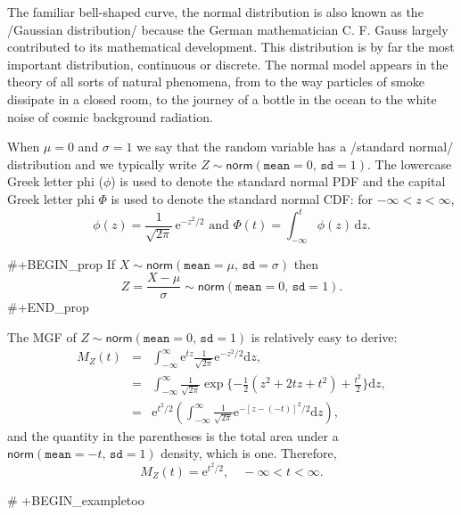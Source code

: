 The familiar bell-shaped curve, the normal distribution is also known
as the /Gaussian distribution/ because the German mathematician
C. F. Gauss largely contributed to its mathematical development. This
distribution is by far the most important distribution, continuous or
discrete. The normal model appears in the theory of all sorts of
natural phenomena, from to the way particles of smoke dissipate in a
closed room, to the journey of a bottle in the ocean to the white
noise of cosmic background radiation.

When \(\mu=0\) and \(\sigma=1\) we say that the random variable has a
/standard normal/ distribution and we typically write
\(Z\sim\mathsf{norm}(\mathtt{mean}=0,\,\mathtt{sd}=1)\). The lowercase
Greek letter phi (\(\phi\)) is used to denote the standard normal PDF
and the capital Greek letter phi \(\Phi\) is used to denote the
standard normal CDF: for \(-\infty<z<\infty\),
\begin{equation}
\phi(z)=\frac{1}{\sqrt{2\pi}}\,\mathrm{e}^{-z^{2}/2}\mbox{ and }\Phi(t)=\int_{-\infty}^{t}\phi(z)\,\mathrm{d} z.
\end{equation}

#+BEGIN_prop
If \(X\sim\mathsf{norm}(\mathtt{mean}=\mu,\,\mathtt{sd}=\sigma)\) then
\begin{equation}
Z=\frac{X-\mu}{\sigma}\sim\mathsf{norm}(\mathtt{mean}=0,\,\mathtt{sd}=1).
\end{equation}
#+END_prop

The MGF of \(Z\sim\mathsf{norm}(\mathtt{mean}=0,\,\mathtt{sd}=1)\) is
relatively easy to derive:
\begin{eqnarray*}
M_{Z}(t) & = & \int_{-\infty}^{\infty}\mathrm{e}^{tz}\frac{1}{\sqrt{2\pi}}\mathrm{e}^{-z^{2}/2}\mathrm{d} z,\\
 & = & \int_{-\infty}^{\infty}\frac{1}{\sqrt{2\pi}}\exp \{ -\frac{1}{2}\left(z^{2}+2tz+t^{2}\right)+\frac{t^{2}}{2} \} \mathrm{d} z,\\
 & = & \mathrm{e}^{t^{2}/2}\left(\int_{-\infty}^{\infty}\frac{1}{\sqrt{2\pi}}\mathrm{e}^{-[z-(-t)]^{2}/2}\mathrm{d} z\right),
\end{eqnarray*}
and the quantity in the parentheses is the total area under a \(\mathsf{norm}(\mathtt{mean}=-t,\,\mathtt{sd}=1)\) density, which is one. Therefore,
\begin{equation}
M_{Z}(t)=\mathrm{e}^{t^{2}/2},\quad -\infty < t < \infty.
\end{equation}

# +BEGIN_exampletoo

